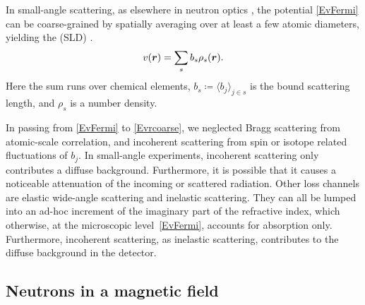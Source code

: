 In small-angle scattering,
%
%
%
as elsewhere in neutron optics \cite{Sea89},
%
%
the potential \cref{EvFermi}
can be coarse-grained by spatially averaging over at least a few atomic diameters,
yielding the  (SLD)
%
%
\cite[eq.\ 2.8.37]{Sea89}.
\begin{equation}\label{Evrcoarse}
  v(\r)
  = \sum_s b_s \rho_s(\r).
\end{equation}
%
Here the sum runs over chemical elements,
$b_s\coloneqq\langle b_j\rangle_{j\in s}$ is the bound  scattering length,
%
%
and $\rho_s$ is a number density.
%
%
%

In passing from \cref{EvFermi} to \cref{Evrcoarse},
we neglected Bragg scattering
%
%
from atomic-scale correlation,
%
%
and incoherent scattering from spin or isotope related fluctuations of $b_j$.
%
%
%
%
In small-angle experiments,
 incoherent scattering only contributes a diffuse background.
Furthermore, it is possible
that it causes a noticeable attenuation of the incoming or scattered radiation.
Other loss channels are elastic wide-angle scattering
%
and inelastic scattering.
%
They can all be lumped into an ad-hoc increment of the
imaginary part of the refractive index,
%
which otherwise, at the microscopic level~\cref{EvFermi},
accounts for absorption
only.
Furthermore, incoherent scattering, as inelastic scattering,
 contributes to the diffuse background in the detector.
%
%
%
%

\subsection{Neutrons in a magnetic field}\label{SnSpinor}

